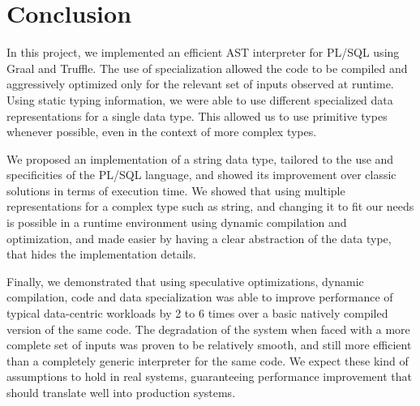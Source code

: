 \documentclass[twoside,11pt,a4paper]{article}
\newcommand{\startsection}[1]{
	\cleardoublepage
	\section{#1}
	\thispagestyle{basic}
}
\begin{document}
\startsection{Conclusion}

In this project, we implemented an efficient AST interpreter for PL/SQL using Graal and Truffle. The use of specialization allowed the code to be compiled and aggressively optimized only for the relevant set of inputs observed at runtime. Using static typing information, we were able to use different specialized data representations for a single data type. This allowed us to use primitive types whenever possible, even in the context of more complex types.

We proposed an implementation of a string data type, tailored to the use and specificities of the PL/SQL language, and showed its improvement over classic solutions in terms of execution time. We showed that using multiple representations for a complex type such as string, and changing it to fit our needs is possible in a runtime environment using dynamic compilation and optimization, and made easier by having a clear abstraction of the data type, that hides the implementation details.

Finally, we demonstrated that using speculative optimizations, dynamic compilation, code and data specialization was able to improve performance of typical data-centric workloads by 2 to 6 times over a basic natively compiled version of the same code. The degradation of the system when faced with a more complete set of inputs was proven to be relatively smooth, and still more efficient than a completely generic interpreter for the same code. We expect these kind of assumptions to hold in real systems, guaranteeing performance improvement that should translate well into production systems.
\end{document}
